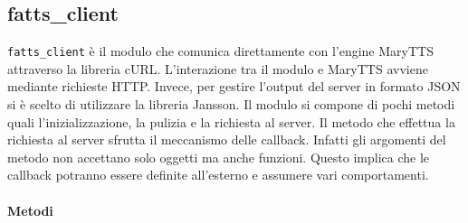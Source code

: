 \subsection{fatts\_client}
\texttt{fatts\_client} è il modulo che comunica direttamente con l'engine MaryTTS attraverso la libreria cURL. L'interazione tra il modulo e MaryTTS avviene mediante richieste HTTP. Invece, per gestire l'output del server in formato JSON si è scelto di utilizzare la libreria Jansson. 
Il modulo si compone di pochi metodi quali l'inizializzazione, la pulizia e la richiesta al server.
Il metodo che effettua la richiesta al server sfrutta il meccanismo delle callback. Infatti gli argomenti del metodo non accettano solo oggetti ma anche funzioni. Questo implica che le callback potranno essere definite all'esterno e assumere vari comportamenti.
\\\\
\textbf{Metodi}
